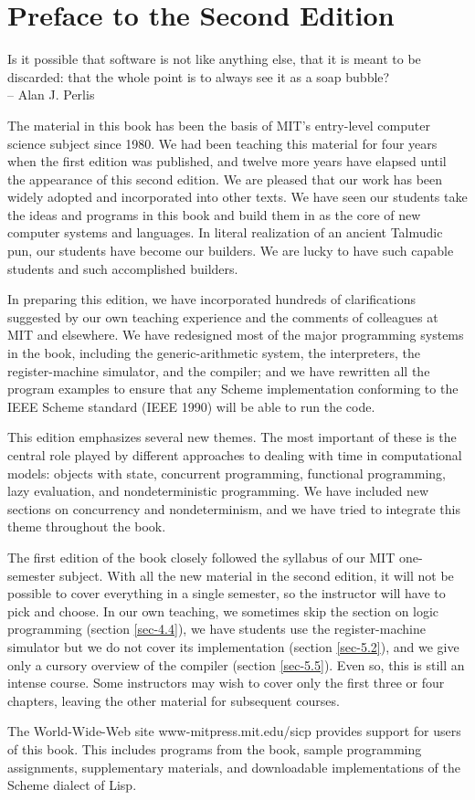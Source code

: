 \chapter{Preface to the Second Edition}

\begin{epigraph}
Is it possible that software is not like anything else, that it
is meant to be discarded: that the whole point is to 
always see it as a soap bubble?\\
-- Alan J. Perlis
\end{epigraph}

The material in this book has been the basis of MIT's entry-level
computer science subject since 1980.  We had been teaching this
material for four years when the first edition was published, and
twelve more years have elapsed until the appearance of this second
edition.  We are pleased that our work has been widely adopted and
incorporated into other texts.  We have seen our students take the
ideas and programs in this book and build them in as the core of new
computer systems and languages.  In literal realization of an ancient
Talmudic pun, our students have become our builders.  We are lucky to
have such capable students and such accomplished builders.

In preparing this edition, we have incorporated hundreds of 
clarifications suggested by our own teaching experience and the
comments of colleagues at MIT and elsewhere.  We have redesigned
most of the major programming systems in the book, including
the generic-arithmetic system, the interpreters, the register-machine
simulator, and the compiler; and we have rewritten all the program
examples to ensure that any Scheme implementation conforming to
the IEEE Scheme standard (IEEE 1990) will be able to run the code.

This edition emphasizes several new themes.  The most important
of these is the central role played by different approaches to
dealing with time in computational models: objects with state,
concurrent programming, functional programming, lazy evaluation,
and nondeterministic programming.  We have included new sections on 
concurrency and nondeterminism, and we have tried to integrate this
theme throughout the book.

The first edition of the book closely followed the syllabus of our MIT
one-semester subject.  With all the new material in the second
edition, it will not be possible to cover everything in a single
semester, so the instructor will have to pick and choose.  In our own
teaching, we sometimes skip the section on logic programming (section
\ref{sec-4.4}), we have students use the register-machine simulator
but we do not cover its implementation (section \ref{sec-5.2}), and we
give only a cursory overview of the compiler (section \ref{sec-5.5}).
Even so, this is still an intense course.  Some instructors may wish
to cover only the first three or four chapters, leaving the other
material for subsequent courses.

The World-Wide-Web site www-mitpress.mit.edu/sicp %
provides support for users of this book.
This includes programs from the book,
sample programming assignments, supplementary materials,
and downloadable implementations of the Scheme dialect of Lisp.

